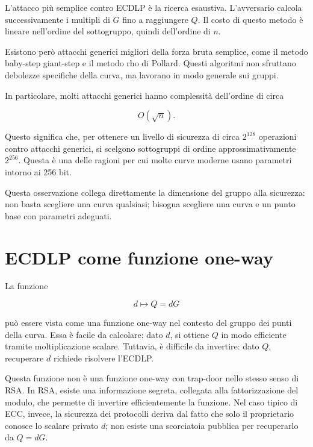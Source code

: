 \documentclass[12pt,a4paper,oneside]{report}
\begin{document}
L'attacco più semplice contro ECDLP è la ricerca esaustiva. L'avversario calcola successivamente i multipli di \(G\) fino a raggiungere \(Q\). Il costo di questo metodo è lineare nell'ordine del sottogruppo, quindi dell'ordine di \(n\).

Esistono però attacchi generici migliori della forza bruta semplice, come il metodo baby-step giant-step e il metodo rho di Pollard. Questi algoritmi non sfruttano debolezze specifiche della curva, ma lavorano in modo generale sui gruppi.

In particolare, molti attacchi generici hanno complessità dell'ordine di circa

\begin{equation}
    O(\sqrt{n}).
\end{equation}

Questo significa che, per ottenere un livello di sicurezza di circa \(2^{128}\) operazioni contro attacchi generici, si scelgono sottogruppi di ordine approssimativamente \(2^{256}\). Questa è una delle ragioni per cui molte curve moderne usano parametri intorno ai 256 bit.

Questa osservazione collega direttamente la dimensione del gruppo alla sicurezza: non basta scegliere una curva qualsiasi; bisogna scegliere una curva e un punto base con parametri adeguati.

\section{ECDLP come funzione one-way}

La funzione

\begin{equation}
    d \longmapsto Q=dG
\end{equation}

può essere vista come una funzione one-way nel contesto del gruppo dei punti della curva. Essa è facile da calcolare: dato \(d\), si ottiene \(Q\) in modo efficiente tramite moltiplicazione scalare. Tuttavia, è difficile da invertire: dato \(Q\), recuperare \(d\) richiede risolvere l'ECDLP.

Questa funzione non è una funzione one-way con trap-door nello stesso senso di RSA. In RSA, esiste una informazione segreta, collegata alla fattorizzazione del modulo, che permette di invertire efficientemente la funzione. Nel caso tipico di ECC, invece, la sicurezza dei protocolli deriva dal fatto che solo il proprietario conosce lo scalare privato \(d\); non esiste una scorciatoia pubblica per recuperarlo da \(Q=dG\).
\end{document}
